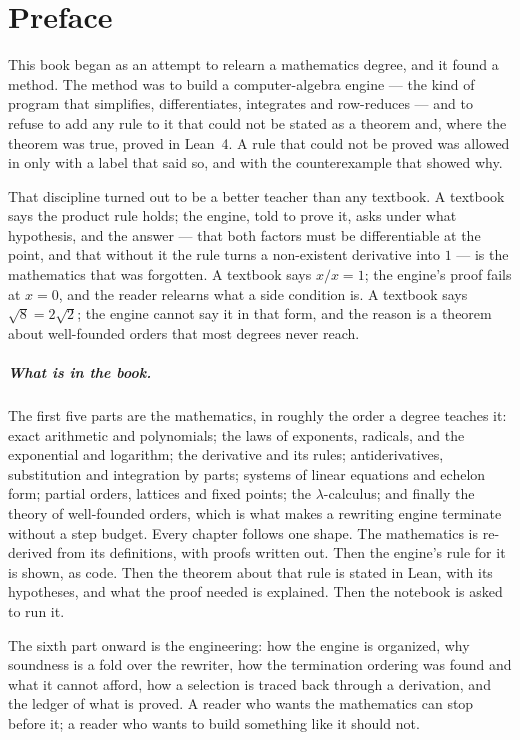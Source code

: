 \chapter*{Preface}

This book began as an attempt to relearn a mathematics degree, and it found a method. The
method was to build a computer-algebra engine --- the kind of program that simplifies, differentiates,
integrates and row-reduces --- and to refuse to add any rule to it that could not be stated as a
theorem and, where the theorem was true, proved in Lean~4. A rule that could not be proved was
allowed in only with a label that said so, and with the counterexample that showed why.

That discipline turned out to be a better teacher than any textbook. A textbook says the product
rule holds; the engine, told to prove it, asks under what hypothesis, and the answer --- that both
factors must be differentiable at the point, and that without it the rule turns a non-existent
derivative into $1$ --- is the mathematics that was forgotten. A textbook says $x/x = 1$; the
engine's proof fails at $x = 0$, and the reader relearns what a side condition is. A textbook
says $\sqrt 8 = 2\sqrt 2$; the engine cannot say it in that form, and the reason is a theorem about
well-founded orders that most degrees never reach.

\paragraph{What is in the book.} The first five parts are the mathematics, in roughly the order a
degree teaches it: exact arithmetic and polynomials; the laws of exponents, radicals, and the
exponential and logarithm; the derivative and its rules; antiderivatives, substitution and
integration by parts; systems of linear equations and echelon form; partial orders, lattices and
fixed points; the $\lambda$-calculus; and finally the theory of well-founded orders, which is what
makes a rewriting engine terminate without a step budget. Every chapter follows one shape. The
mathematics is re-derived from its definitions, with proofs written out. Then the engine's rule for
it is shown, as code. Then the theorem about that rule is stated in Lean, with its hypotheses, and
what the proof needed is explained. Then the notebook is asked to run it.

The sixth part onward is the engineering: how the engine is organized, why soundness is a fold
over the rewriter, how the termination ordering was found and what it cannot afford, how a
selection is traced back through a derivation, and the ledger of what is proved. A reader who
wants the mathematics can stop before it; a reader who wants to build something like it should
not.


